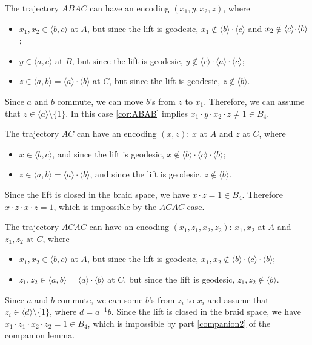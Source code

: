 \documentclass[a4paper,10pt]{article}
\begin{document}
The trajectory $ABAC$ can have an encoding $(x_1,y,x_2,z)$, where
\begin{itemize}
\item $x_1,x_2\in \langle b,c\rangle$ at $A$, but since the lift is geodesic, $x_1\notin \langle b\rangle\cdot\langle c\rangle$ and
$x_2\z\notin \langle c\rangle\cdot\langle b\rangle$;
\item $y\in \langle a,c\rangle$ at $B$, but since the lift is geodesic, $y\notin \langle c\rangle\cdot\langle a\rangle\cdot\langle c\rangle$;
\item $z\in  \langle a,b\rangle=\langle a\rangle\cdot\langle b\rangle$ at $C$, but since the lift is geodesic, $z\notin \langle b\rangle$.
\end{itemize}
Since $a$ and $b$ commute, we can move $b$'s from $z$ to $x_1$.
Therefore, we can assume that $z\in \langle a\rangle\setminus\{1\}$.
In this case \ref{cor:ABAB} implies $x_1\cdot y\cdot x_2\cdot z\ne 1\in B_4$.

 The trajectory $AC$ can have an encoding $(x,z)$: $x$ at $A$ and $z$ at $C$, where
\begin{itemize}
 \item $x\in \langle b,c\rangle$, and since the lift is geodesic, $x\notin\langle b\rangle\cdot\langle c\rangle\cdot\langle b\rangle$;
 \item $z\in \langle a,b\rangle=\langle a\rangle\cdot\langle b\rangle$, and since the lift is geodesic, $z\notin \langle b\rangle$.
\end{itemize}
Since the lift is closed in the braid space, we have $x\cdot z=1\in B_4$.
Therefore $x\cdot z\cdot x\cdot z=1$, which is impossible by the $ACAC$ case.

 The trajectory $ACAC$ can have an encoding $(x_1,z_1,x_2,z_2)$: $x_1,x_2$ at $A$ and $z_1,z_2$ at $C$, where
\begin{itemize}
 \item $x_1,x_2\in \langle b,c\rangle$ at $A$, but since the lift is geodesic, $x_1,x_2\notin\langle b\rangle\cdot\langle c\rangle\cdot\langle b\rangle$;
 \item $z_1,z_2\in \langle a,b\rangle=\langle a\rangle\cdot\langle b\rangle$ at $C$, but since the lift is geodesic, $z_1,z_2\notin \langle b\rangle$.
\end{itemize}
Since $a$ and $b$ commute, we can some $b$'s from $z_i$ to $x_i$ and assume that $z_i\in \langle d\rangle\setminus\{1\}$, where $d=a^{-1}b$.
Since the lift is closed in the braid space, we have $x_1\cdot z_1\cdot x_2\cdot z_2 =1\in B_4$, which is impossible by part \ref{companion2} of the companion lemma.
\end{document}
